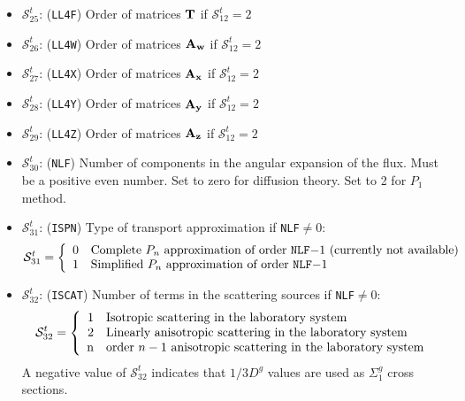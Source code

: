 \begin{itemize}
\item $\mathcal{S}^{t}_{25}$: ({\tt LL4F}) Order of matrices $\bf{T}$ if $\mathcal{S}^{t}_{12}=2$

\item $\mathcal{S}^{t}_{26}$: ({\tt LL4W}) Order of matrices $\bf{A_w}$ if $\mathcal{S}^{t}_{12}=2$

\item $\mathcal{S}^{t}_{27}$: ({\tt LL4X}) Order of matrices $\bf{A_x}$ if $\mathcal{S}^{t}_{12}=2$

\item $\mathcal{S}^{t}_{28}$: ({\tt LL4Y}) Order of matrices $\bf{A_y}$ if $\mathcal{S}^{t}_{12}=2$

\item $\mathcal{S}^{t}_{29}$: ({\tt LL4Z}) Order of matrices $\bf{A_z}$ if $\mathcal{S}^{t}_{12}=2$

\item $\mathcal{S}^{t}_{30}$: ({\tt NLF}) Number of components in the angular expansion of the flux. Must be a positive
even number. Set to zero for diffusion theory. Set to 2 for $P_1$ method.

\item $\mathcal{S}^{t}_{31}$: ({\tt ISPN}) Type of transport approximation if {\tt NLF}$\ne 0$:
\begin{displaymath}
\mathcal{S}^{t}_{31} = \left\{
\begin{array}{rl}
 0 & \textrm{Complete $P_n$ approximation of order {\tt NLF}$-1$ (currently not available)}\\
 1 & \textrm{Simplified $P_n$ approximation of order {\tt NLF}$-1$}
\end{array} \right.
\end{displaymath}

\item $\mathcal{S}^{t}_{32}$: ({\tt ISCAT}) Number of terms in the scattering sources if {\tt NLF}$\ne 0$:
\begin{displaymath}
\mathcal{S}^{t}_{32} = \left\{
\begin{array}{rl}
 1 & \textrm{Isotropic scattering in the laboratory system} \\
 2 & \textrm{Linearly anisotropic scattering in the laboratory system} \\
 $n$ & \textrm{order $n-1$ anisotropic scattering in the laboratory system}
\end{array} \right.
\end{displaymath}
\noindent A negative value of $\mathcal{S}^{t}_{32}$ indicates that $1/3D^{g}$ values are used as $\Sigma_1^{g}$ cross sections.


\end{itemize}
